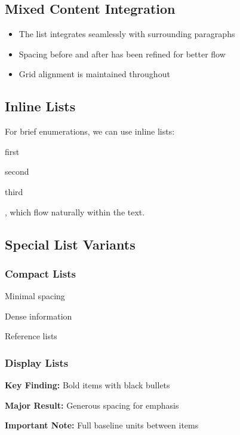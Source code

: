 \documentclass[11pt,a4paper]{article}
\begin{document}
\subsection{Mixed Content Integration}

\lipsum[1][1-3]

\begin{itemize}
\item The list integrates seamlessly with surrounding paragraphs
\item Spacing before and after has been refined for better flow
\item Grid alignment is maintained throughout
\end{itemize}

\lipsum[2][1-3]

\subsection{Inline Lists}

For brief enumerations, we can use inline lists: \begin{inlineitem}
\item first \item second \item third
\end{inlineitem}, which flow naturally within the text.

\subsection{Special List Variants}

\subsubsection{Compact Lists}
\begin{compactitem}
\item Minimal spacing
\item Dense information
\item Reference lists
\end{compactitem}

\subsubsection{Display Lists}
\begin{displayitem}
\item \textbf{Key Finding:} Bold items with black bullets
\item \textbf{Major Result:} Generous spacing for emphasis
\item \textbf{Important Note:} Full baseline units between items
\end{displayitem}
\end{document}
